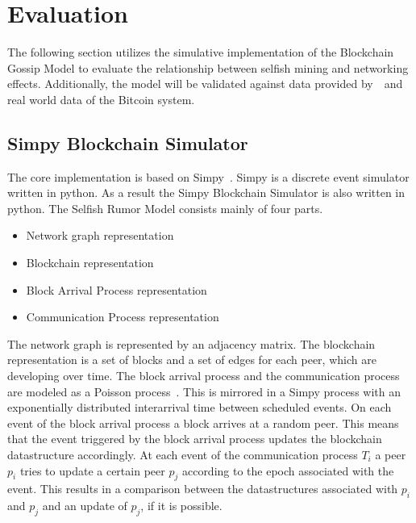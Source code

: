 \chapter{Evaluation}\label{chap:evaluation}
The following section utilizes the simulative implementation of the Blockchain Gossip Model to evaluate the relationship between selfish mining and networking effects. Additionally, the model will be validated against data provided by~~and real world data of the Bitcoin system.
\section{Simpy Blockchain Simulator}
The core implementation is based on Simpy~\cite{simpy}. Simpy is a discrete event simulator written in python. As a result the Simpy Blockchain Simulator is also written in python. 
The Selfish Rumor Model consists mainly of four parts. 
\begin{itemize}
\item Network graph representation
\item Blockchain representation
\item Block Arrival Process representation
\item Communication Process representation
\end{itemize}
The network graph is represented by an adjacency matrix. The blockchain representation is a set of blocks and a set of edges for each peer, which are developing over time. The block arrival process and the communication process are modeled as a Poisson process~\cite{poisson}. This is mirrored in a Simpy process with an exponentially distributed interarrival time between scheduled events.
On each event of the block arrival process a block arrives at a random peer. This means that the event triggered by the block arrival process updates the blockchain datastructure accordingly.
At each event of the communication process $T_i$ a peer $p_i$ tries to update a certain peer $p_j$ according to the epoch associated with the event. This results in a comparison between the datastructures associated with $p_i$ and $p_j$ and an update of $p_j$, if it is possible.

